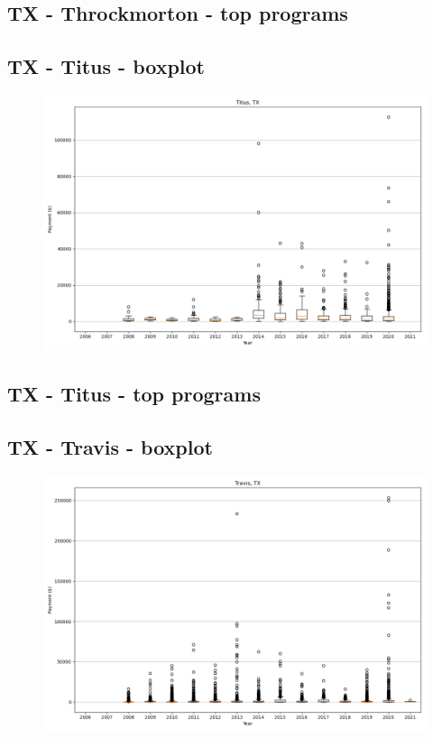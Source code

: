 \subsection*{TX - Throckmorton - top programs}

\newpage
\subsection*{TX - Titus - boxplot}
\begin{figure}[h]
\centering
\includegraphics[width=7in]{../output/boxplots/counties/Titus-TX_boxplot.png}
\end{figure}


\subsection*{TX - Titus - top programs}

\newpage
\subsection*{TX - Travis - boxplot}
\begin{figure}[h]
\centering
\includegraphics[width=7in]{../output/boxplots/counties/Travis-TX_boxplot.png}
\end{figure}


